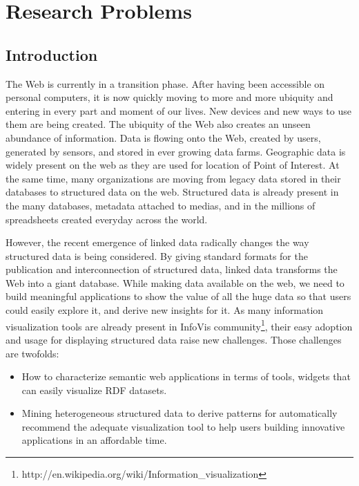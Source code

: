 \documentclass[a4paper,11pt]{report}
\begin{document}

\chapter{Research Problems}

\section{Introduction}
The Web is currently in a transition phase. After having been accessible on personal computers, it is now 
quickly moving to more and more ubiquity and entering in every part and moment of our lives. New 
devices and new ways to use them are being created. The ubiquity of the Web also creates an unseen 
abundance of information. Data is flowing onto the Web, created by users, generated by sensors, and 
stored in ever growing data farms. Geographic data is widely present on the web as they are used for location 
of Point of Interest. At the same time, many organizations are moving from legacy data stored in their databases
to structured data on the web. Structured data is already present in the many databases, metadata attached to medias, and in the millions of spreadsheets created everyday across the world. 

However, the recent emergence of linked data radically changes the way structured data is being considered. By giving standard formats for the publication and interconnection of structured data, linked data transforms the Web into a giant database. While making data available on the web, we need to build meaningful applications to show the value of all the huge data so that users could easily explore it, and derive new insights for it. As many information visualization tools are already present in InfoVis community\footnote{http://en.wikipedia.org/wiki/Information\_visualization}, their easy adoption and usage for displaying structured data raise new challenges. Those challenges are twofolds:
\begin{itemize}
\item How to characterize semantic web applications in terms of tools, widgets that can easily visualize RDF datasets.
\item Mining heterogeneous structured data to derive patterns for automatically recommend the adequate visualization tool to help users building innovative applications in an affordable time.
\end{itemize}


\end{document}
